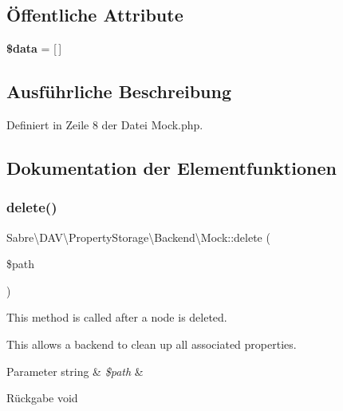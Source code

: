 \subsection*{Öffentliche Attribute}
\begin{DoxyCompactItemize}
\item 
\mbox{\label{class_sabre_1_1_d_a_v_1_1_property_storage_1_1_backend_1_1_mock_a958bbffa43d55e2627c4a97820e5ec93}} 
{\bfseries \$data} = \mbox{[}$\,$\mbox{]}
\end{DoxyCompactItemize}


\subsection{Ausführliche Beschreibung}


Definiert in Zeile 8 der Datei Mock.\+php.



\subsection{Dokumentation der Elementfunktionen}
\mbox{\label{class_sabre_1_1_d_a_v_1_1_property_storage_1_1_backend_1_1_mock_a6c1045261abf7f52248c8f0b217f90ae}} 
\subsubsection{\texorpdfstring{delete()}{delete()}}
{\footnotesize\ttfamily Sabre\textbackslash{}\+D\+A\+V\textbackslash{}\+Property\+Storage\textbackslash{}\+Backend\textbackslash{}\+Mock\+::delete (\begin{DoxyParamCaption}\item[{}]{\$path }\end{DoxyParamCaption})}

This method is called after a node is deleted.

This allows a backend to clean up all associated properties.


\begin{DoxyParams}[1]{Parameter}
string & {\em \$path} & \\
\hline
\end{DoxyParams}
\begin{DoxyReturn}{Rückgabe}
void 
\end{DoxyReturn}


